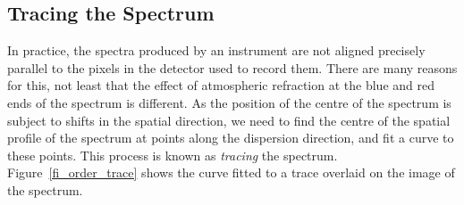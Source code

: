 \documentclass[twoside,11pt]{starlink}
\providecommand{\mlabel}[1]{\xlabel{#1}\label{#1}}
\providecommand{\scspec}[2]{#1}
\begin{document}
\subsection{\mlabel{tracing}Tracing the Spectrum}

In practice, the spectra produced by an instrument are not aligned
precisely parallel to the pixels in the detector used to record them.
There are many reasons for this, not least that the effect of
atmospheric refraction at the blue and red ends of the spectrum is
different.
As the position of the centre of the spectrum is subject to shifts in the
spatial direction, we need to find the centre of the spatial profile of
the spectrum at points along the dispersion direction, and fit
a curve to these points.
This process is known as \emph{tracing} the spectrum.
\scspec{Figure~\ref{fi_order_trace}}{The figure below} shows the
curve fitted to a trace overlaid on the image of the spectrum.
\end{document}
